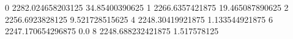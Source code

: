 0 2282.024658203125 34.85400390625
1 2266.6357421875 19.465087890625
2 2256.6923828125 9.521728515625
4 2248.30419921875 1.133544921875
6 2247.170654296875 0.0
8 2248.688232421875 1.517578125
